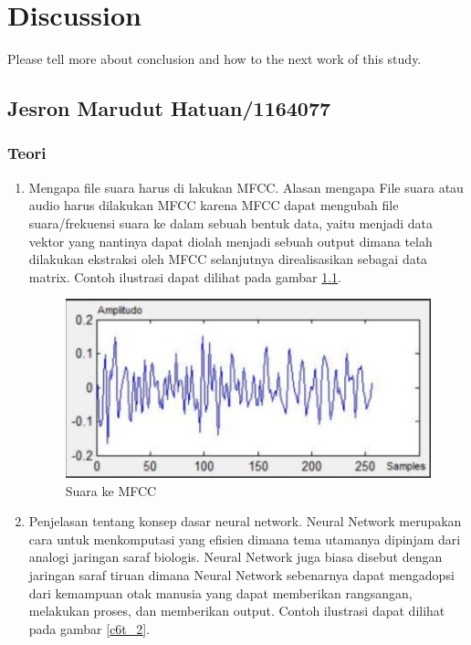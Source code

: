 \chapter{Discussion}
Please tell more about conclusion and how to the next work of this study.

\section{Jesron Marudut Hatuan/1164077}
\subsection{Teori}
\begin{enumerate}
\item Mengapa file suara harus di lakukan MFCC.
\subitem Alasan mengapa File suara atau audio harus dilakukan MFCC  karena MFCC dapat mengubah file suara/frekuensi suara ke dalam sebuah bentuk data, yaitu menjadi data vektor yang nantinya dapat diolah menjadi sebuah output dimana telah dilakukan ekstraksi oleh MFCC selanjutnya direalisasikan sebagai data matrix. Contoh ilustrasi dapat dilihat pada gambar \ref{c6t_1}.
\begin{figure}[!htbp]
\centerline{\includegraphics[width=1\textwidth]{figures/c6t/1.JPG}}
\caption{Suara ke MFCC}
\label{c6t_1}
\end{figure} 
\item Penjelasan tentang konsep dasar neural network.
\subitem Neural Network merupakan cara untuk menkomputasi yang efisien dimana tema utamanya dipinjam dari analogi jaringan saraf biologis. Neural Network juga biasa disebut dengan jaringan saraf tiruan dimana Neural Network sebenarnya dapat mengadopsi dari kemampuan otak manusia yang dapat memberikan rangsangan, melakukan proses, dan memberikan output. Contoh ilustrasi dapat dilihat pada gambar \ref{c6t_2}.
\begin{figure}[!htbp]

\end{figure}
\end{enumerate}
